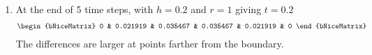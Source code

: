 \begin{enumerate}
    \item At the end of 5 time steps, with $ h = 0.2 $ and $ r = 1 $ giving $ t = 0.2 $
          \begin{align}
              \begin{bNiceMatrix}
                  0 & 0.021919 & 0.035467 & 0.035467 & 0.021919 & 0
              \end{bNiceMatrix}
          \end{align}
          The differences are larger at points farther from the boundary.

\end{enumerate}